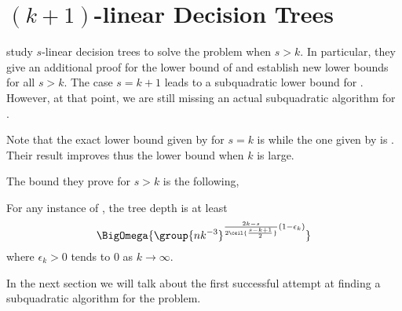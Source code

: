 \section{$(k+1)$-linear Decision Trees}

\citet*{ailon:2005} study $s$-linear decision trees to solve the \kSUM
problem when $s > k$. In particular, they give an additional proof for the
 lower bound of \citet{erickson:1999} and
establish new lower bounds for all $s > k$. The case $s = k+1$ leads to a
subquadratic lower bound for \threeSUM. However, at that point, we are still
missing an actual subquadratic algorithm for \threeSUM.

Note that the exact lower bound given by \citet*{erickson:1999} for \(s = k\) is
 while the one given by
\citet*{ailon:2005} is . Their result
improves thus the lower bound when \(k\) is large.

The bound they prove for \(s > k\) is the following,
\begin{theorem}
For any instance of \kLDT, the tree depth is at least
\begin{displaymath}
\BigOmega{\group{nk^{-3}}^{\frac{2k-s}{2\ceil{\frac{s-k+1}{2}}} (1-\epsilon_k) }}
\end{displaymath}
where \(\epsilon_k > 0\) tends to \(0\) as \(k \to\infty\).
\end{theorem}

In the next section we will talk about the first successful attempt at finding
a subquadratic algorithm for the \threeSUM problem.

